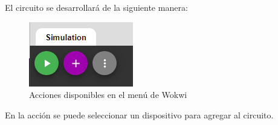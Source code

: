 \documentclass{article}
\begin{document}
    \bigbreak

    El circuito se desarrollará de la siguiente manera:

    \begin{figure}[H]
        \centering
        \includegraphics[width=0.2\paperwidth]{images/wokwi-actions}
        \caption{Acciones disponibles en el menú de Wokwi}
    \end{figure}

    En la acción  se puede seleccionar un dispositivo para agregar al circuito.
\end{document}
